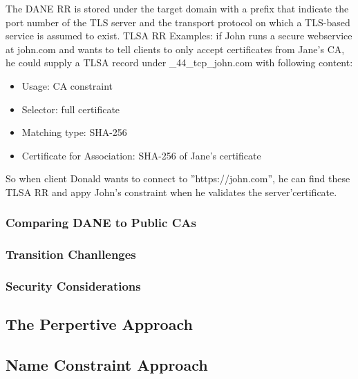 \indent The DANE RR is stored under the target domain with a prefix that indicate the port number of the TLS server and the transport protocol on which a TLS-based service is assumed to exist.
\indent TLSA RR Examples: if John runs a secure webservice at john.com and wants to  tell clients to only accept certificates from Jane's CA, he could supply  a TLSA record  under _44_tcp_john.com with following content:
\begin{itemize}
\item Usage: CA constraint
\item Selector: full certificate
\item Matching type: SHA-256
\item Certificate for Association: SHA-256 of Jane's certificate
\end{itemize}
So when client Donald wants to connect to ''https://john.com'', he can find these TLSA RR and appy John's constraint when he validates the server'certificate.
\subsubsection{Comparing DANE to Public CAs}
\subsubsection{Transition Chanllenges}
\subsubsection{Security Considerations}
\subsection{The Perpertive Approach}
\subsection{Name Constraint Approach}